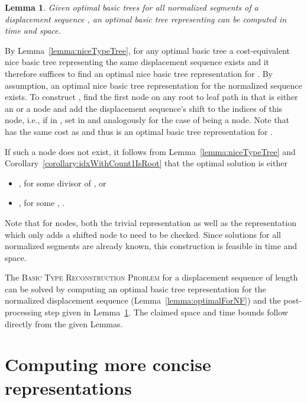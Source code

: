 \documentclass[a4paper,11pt]{article}
\newtheorem{lemma}{Lemma}
\newenvironment{proof}{\par\noindent{\textsc{Proof:}}\space}{\protect\\ \par}
\begin{document}
\begin{lemma}
\label{lemma:optimalForAny}
Given optimal basic trees  for all normalized segments
 of a displacement sequence , an optimal basic tree
 representing  can be computed in  time and 
space.
\end{lemma}
\begin{proof}
By Lemma~\ref{lemma:niceTypeTree}, for any optimal basic tree  a
cost-equivalent nice basic tree  representing the same
displacement sequence  exists and it therefore suffices to find an
optimal nice basic tree representation  for .  By
assumption, an optimal nice basic tree representation  for the normalized sequence  exists.  To
construct , find the first node  on any root to leaf
path in  that is either an  or a  node and add
the displacement sequence's shift  to the indices of this
node, i.e., if  in
, set  in  and analogously for the case of  being a
 node.  Note that  has the same cost as 
and thus is an optimal basic tree representation for .

If such a node does not exist, it follows from
Lemma~\ref{lemma:niceTypeTree} and
Corollary~\ref{corollary:idxWithCount1IsRoot} that the optimal
solution is either
\begin{itemize}
 \item , for some divisor  of , or
 \item , for some , .
\end{itemize}
Note that for  nodes, both the trivial representation  as well as the representation  which only adds a shifted node to  need to be
checked.  Since solutions for all normalized segments are already
known, this construction is feasible in  time and 
space.
\end{proof}

\begin{proof}[of Theorem~\ref{thm:polytree}]
The \textsc{Basic Type Reconstruction Problem} for a displacement
sequence  of length  can be solved by computing an optimal basic
tree representation for the normalized displacement sequence 
(Lemma~\ref{lemma:optimalForNF}) and the post-processing step given in
Lemma~\ref{lemma:optimalForAny}.  The claimed space and time bounds
follow directly from the given Lemmas.
\end{proof}

\section{Computing more concise representations}
\label{sec:generalizations}
\end{document}
